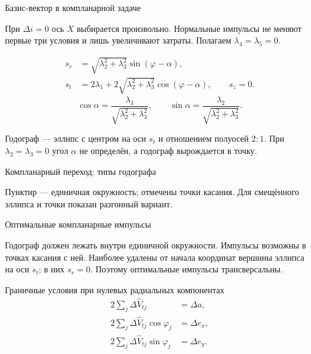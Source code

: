 \documentclass[11pt,aspectratio=169,t]{beamer}
\newcommand{\figcaption}[1]{{\usebeamerfont{caption}\color{coursemuted}#1\par}}
\newcommand{\derivationmathspacing}{%
  \setlength{\abovedisplayskip}{2pt}%
  \setlength{\belowdisplayskip}{3pt}%
  \setlength{\abovedisplayshortskip}{2pt}%
  \setlength{\belowdisplayshortskip}{2pt}%
  \setlength{\jot}{2pt}}
\begin{document}
\begin{frame}{Базис-вектор в компланарной задаче}
\relax
\derivationmathspacing
{\justifying
При $\Delta i=0$ ось $X$ выбирается произвольно.
Нормальные импульсы не меняют первые три условия и лишь увеличивают
затраты. Полагаем $\lambda_4=\lambda_5=0$.
\par}
\[
\boxed{\begin{aligned}
 s_r&=\sqrt{\lambda_2^2+\lambda_3^2}\sin(\varphi-\alpha),\\
 s_t&=2\lambda_1+2\sqrt{\lambda_2^2+\lambda_3^2}\cos(\varphi-\alpha),
 \qquad s_z=0.
\end{aligned}}
\]
\[
 \cos\alpha=\frac{\lambda_3}{\sqrt{\lambda_2^2+\lambda_3^2}},\qquad
 \sin\alpha=\frac{\lambda_2}{\sqrt{\lambda_2^2+\lambda_3^2}}.
\]
\smallskip
{\justifying
Годограф --- эллипс с центром на оси $s_t$ и отношением полуосей $2:1$.
При $\lambda_2=\lambda_3=0$ угол $\alpha$ не определён,
а годограф вырождается в точку.
\par}
\end{frame}


\begin{frame}{Компланарный переход: типы годографа}
\relax
\centering

\par\medskip
\figcaption{Пунктир --- единичная окружность; отмечены точки касания.
Для смещённого эллипса и точки показан разгонный вариант.}
\end{frame}

\begin{frame}{Оптимальные компланарные импульсы}
\relax
{\justifying
Годограф должен лежать внутри единичной окружности.
Импульсы возможны в точках касания с ней.
Наиболее удалены от начала координат вершины эллипса на оси $s_t$;
в них $s_r=0$. Поэтому оптимальные импульсы трансверсальны.
\par}
\begin{block}{Граничные условия при нулевых радиальных компонентах}
\derivationmathspacing
\[
\begin{aligned}
 2\sum\nolimits_j\Delta\widehat V_{tj}&=\Delta a,\\
 2\sum\nolimits_j\Delta\widehat V_{tj}\cos\varphi_j&=\Delta e_x,\\
 2\sum\nolimits_j\Delta\widehat V_{tj}\sin\varphi_j&=\Delta e_y.
\end{aligned}
\]
\end{block}
\end{frame}
\end{document}
